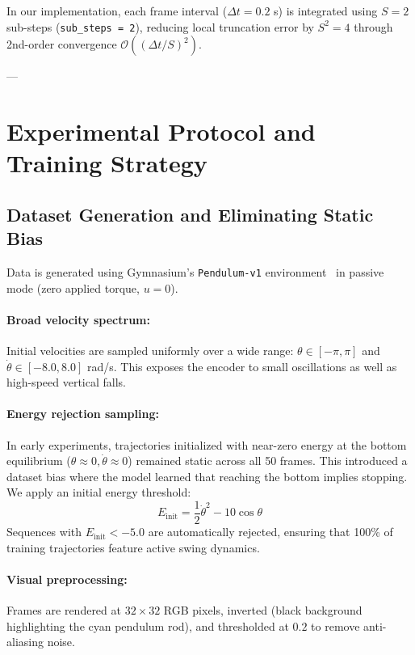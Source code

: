 \documentclass[11pt]{article}
\begin{document}
In our implementation, each frame interval ($\Delta t = 0.2$ s) is integrated using $S=2$ sub-steps (\texttt{sub\_steps = 2}), reducing local truncation error by $S^2 = 4$ through 2nd-order convergence $\mathcal{O}((\Delta t / S)^2)$.

---

\section{Experimental Protocol and Training Strategy}
\label{sec:experiments}

\subsection{Dataset Generation and Eliminating Static Bias}

Data is generated using Gymnasium's \texttt{Pendulum-v1} environment~\cite{gymnasium_2025} in passive mode (zero applied torque, $u = 0$).

\paragraph{Broad velocity spectrum:} Initial velocities are sampled uniformly over a wide range: $\theta \in [-\pi, \pi]$ and $\dot{\theta} \in [-8.0, 8.0]$ rad/s. This exposes the encoder to small oscillations as well as high-speed vertical falls.

\paragraph{Energy rejection sampling:} In early experiments, trajectories initialized with near-zero energy at the bottom equilibrium ($\theta \approx 0, \dot{\theta} \approx 0$) remained static across all 50 frames. This introduced a dataset bias where the model learned that reaching the bottom implies stopping. We apply an initial energy threshold:
\begin{equation}
    E_{\text{init}} = \frac{1}{2}\dot{\theta}^2 - 10\cos\theta
\end{equation}
Sequences with $E_{\text{init}} < -5.0$ are automatically rejected, ensuring that 100\% of training trajectories feature active swing dynamics.

\paragraph{Visual preprocessing:} Frames are rendered at $32 \times 32$ RGB pixels, inverted (black background highlighting the cyan pendulum rod), and thresholded at $0.2$ to remove anti-aliasing noise.
\end{document}
